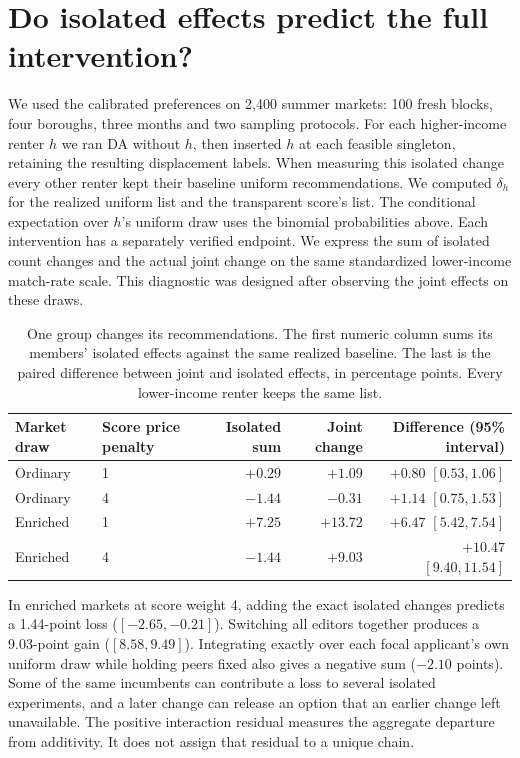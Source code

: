 \section{Do isolated effects predict the full intervention?}
\label{sec:nonadditive}
We used the calibrated preferences on 2,400 summer markets: 100 fresh blocks, four boroughs, three months and two sampling protocols. For each higher-income renter $h$ we ran DA without $h$, then inserted $h$ at each feasible singleton, retaining the resulting displacement labels. When measuring this isolated change every other renter kept their baseline uniform recommendations. We computed $\delta_h$ for the realized uniform list and the transparent score's list. The conditional expectation over $h$'s uniform draw uses the binomial probabilities above. Each intervention has a separately verified endpoint. We express the sum of isolated count changes and the actual joint change on the same standardized lower-income match-rate scale. This diagnostic was designed after observing the joint effects on these draws.

\begin{table}[t]
\caption{One group changes its recommendations. The first numeric column sums its members' isolated effects against the same realized baseline. The last is the paired difference between joint and isolated effects, in percentage points. Every lower-income renter keeps the same list.}
\label{tab:isolated}
\centering
\begin{tabular}{@{}llrrr@{}}\toprule
Market draw & Score price penalty & Isolated sum & Joint change & Difference (95\% interval)\\\midrule
Ordinary & 1 & $+0.29$ & $+1.09$ & $+0.80$ $[0.53,1.06]$\\
Ordinary & 4 & $-1.44$ & $-0.31$ & $+1.14$ $[0.75,1.53]$\\
Enriched & 1 & $+7.25$ & $+13.72$ & $+6.47$ $[5.42,7.54]$\\
Enriched & 4 & $-1.44$ & $+9.03$ & $+10.47$ $[9.40,11.54]$\\\bottomrule
\end{tabular}
\end{table}

In enriched markets at score weight 4, adding the exact isolated changes predicts a 1.44-point loss ($[-2.65,-0.21]$). Switching all editors together produces a 9.03-point gain ($[8.58,9.49]$). Integrating exactly over each focal applicant's own uniform draw while holding peers fixed also gives a negative sum ($-2.10$ points). Some of the same incumbents can contribute a loss to several isolated experiments, and a later change can release an option that an earlier change left unavailable. The positive interaction residual measures the aggregate departure from additivity. It does not assign that residual to a unique chain.

